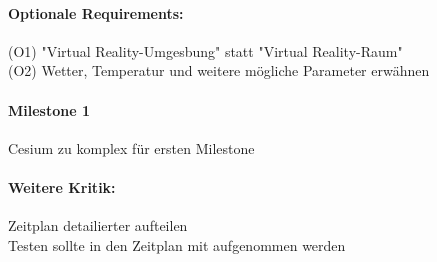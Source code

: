 \documentclass{article}
\begin{document}
	
	\paragraph{Optionale Requirements:}
	(O1) "Virtual Reality-Umgesbung" statt "Virtual Reality-Raum"\\
	(O2) Wetter, Temperatur und weitere mögliche Parameter erwähnen\\
	
	
	\paragraph{Milestone 1}
	Cesium zu komplex für ersten Milestone\\
	
	\paragraph{Weitere Kritik:}
	
	Zeitplan detailierter aufteilen\\
	Testen sollte in den Zeitplan mit aufgenommen werden\\
	
	
	
	
\end{document}

